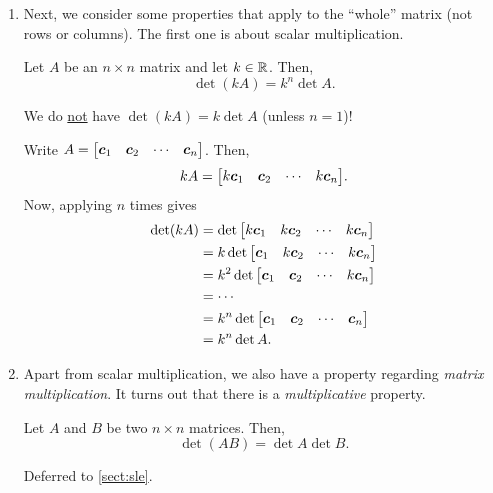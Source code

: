 \begin{enumerate}
\item Next, we consider some properties that apply to the ``whole'' matrix (not
rows or columns). The first one is about scalar multiplication.
\begin{proposition}
\label{prp:det-scalar-mult}
Let \(A\) be an \(n\times n\) matrix and let \(k\in\mathbb{R}\). Then,
\[
\det(kA)=k^n\det A.
\]
\begin{warning}
We do \underline{not} have \(\det(kA)=k\det A\) (unless \(n=1\))!
\end{warning}
\end{proposition}
\begin{pf}
Write \(A=\mqty[\vect{c}_{1}&\vect{c}_{2}&\cdots&\vect{c}_{n}]\). Then,
\[
kA=\mqty[k\vect{c}_{1}&\vect{c}_{2}&\cdots&k\vect{c}_{n}].
\]
Now, applying  \(n\) times gives
\begin{align*}
\det(kA)&=\det\mqty[k\vect{c}_{1}&k\vect{c}_{2}&\cdots&k\vect{c}_{n}]\\
&=k\det\mqty[\vect{c}_{1}&k\vect{c}_{2}&\cdots&k\vect{c}_{n}]\\
&=k^{2}\det\mqty[\vect{c}_{1}&\vect{c}_{2}&\cdots&k\vect{c}_{n}]\\
&=\dotsb\\
&=k^n\det\mqty[\vect{c}_{1}&\vect{c}_{2}&\cdots&\vect{c}_{n}]\\
&=k^n\det A.
\end{align*}
\end{pf}

\item Apart from scalar multiplication, we also have a property regarding
\emph{matrix multiplication}. It turns out that there is a
\emph{multiplicative} property.
\begin{proposition}[Multiplicative]
\label{prp:det-multiplicative}
Let \(A\) and \(B\) be two \(n\times n\) matrices. Then,
\[
\det(AB)=\det A\det B.
\]
\end{proposition}
\begin{pf}
Deferred to \cref{sect:sle}.
\end{pf}


\end{enumerate}
